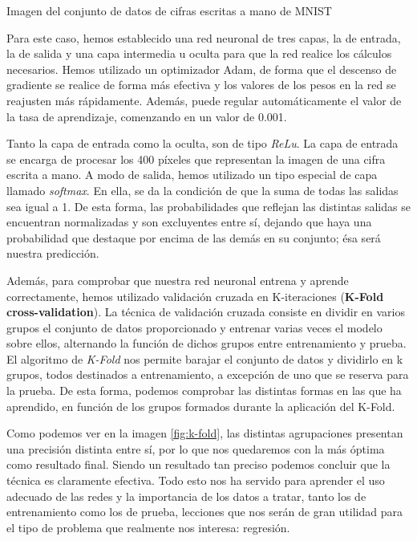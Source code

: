 %
       {Imagen del conjunto de datos de cifras escritas a mano de MNIST \citep{Lecun98gradient-basedlearning}} 

Para este caso, hemos establecido una red neuronal de tres capas, la de entrada, la de salida y una capa intermedia u oculta para que la red realice los cálculos necesarios. Hemos utilizado un optimizador Adam, de forma que el descenso de gradiente se realice de forma más efectiva y los valores de los pesos en la red se reajusten más rápidamente. Además, puede regular automáticamente el valor de la tasa de aprendizaje, comenzando en un valor de 0.001.

Tanto la capa de entrada como la oculta, son de tipo \textit{ReLu}. La capa de entrada se encarga de procesar los 400 píxeles que representan la imagen de una cifra escrita a mano. A modo de salida, hemos utilizado un tipo especial de capa llamado \textit{softmax}. En ella, se da la condición de que la suma de todas las salidas sea igual a 1. De esta forma, las probabilidades que reflejan las distintas salidas se encuentran normalizadas y son excluyentes entre sí, dejando que haya una probabilidad que destaque por encima de las demás en su conjunto; ésa será nuestra predicción. 

Además, para comprobar que nuestra red neuronal entrena y aprende correctamente, hemos utilizado validación cruzada en K-iteraciones (\textbf{K-Fold cross-validation}). La técnica de validación cruzada consiste en dividir en varios grupos el conjunto de datos proporcionado y entrenar varias veces el modelo sobre ellos, alternando la función de dichos grupos entre entrenamiento y prueba. El algoritmo de \textit{K-Fold} nos permite barajar el conjunto de datos y dividirlo en k grupos, todos destinados a entrenamiento, a excepción de uno que se reserva para la prueba. De esta forma, podemos comprobar las distintas formas en las que ha aprendido, en función de los grupos formados durante la aplicación del K-Fold.

Como podemos ver en la imagen \ref{fig:k-fold}, las distintas agrupaciones presentan una precisión distinta entre sí, por lo que nos quedaremos con la más óptima como resultado final. Siendo un resultado tan preciso podemos concluir que la técnica es claramente efectiva. Todo esto nos ha servido para aprender el uso adecuado de las redes y la importancia de los datos a tratar, tanto los de entrenamiento como los de prueba, lecciones que nos serán de gran utilidad para el tipo de problema que realmente nos interesa: regresión.

